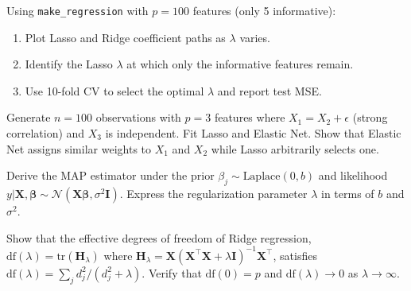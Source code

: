 \begin{exercise}
Using \texttt{make\_regression} with $p=100$ features (only 5 informative):
\begin{enumerate}
    \item Plot Lasso and Ridge coefficient paths as $\lambda$ varies.
    \item Identify the Lasso $\lambda$ at which only the informative features remain.
    \item Use 10-fold CV to select the optimal $\lambda$ and report test MSE.
\end{enumerate}
\end{exercise}

\begin{exercise}
Generate $n=100$ observations with $p=3$ features where $X_1 = X_2 + \epsilon$ (strong correlation) and $X_3$ is independent. Fit Lasso and Elastic Net. Show that Elastic Net assigns similar weights to $X_1$ and $X_2$ while Lasso arbitrarily selects one.
\end{exercise}

\begin{exercise}
Derive the MAP estimator under the prior $\beta_j \sim \text{Laplace}(0, b)$ and likelihood $y|\bm{X},\bm{\beta} \sim \mathcal{N}(\bm{X}\bm{\beta}, \sigma^2\bm{I})$. Express the regularization parameter $\lambda$ in terms of $b$ and $\sigma^2$.
\end{exercise}

\begin{exercise}
Show that the effective degrees of freedom of Ridge regression, $\text{df}(\lambda) = \text{tr}(\bm{H}_\lambda)$ where $\bm{H}_\lambda = \bm{X}(\bm{X}^\top\bm{X}+\lambda\bm{I})^{-1}\bm{X}^\top$, satisfies $\text{df}(\lambda) = \sum_j d_j^2/(d_j^2+\lambda)$. Verify that $\text{df}(0)=p$ and $\text{df}(\lambda) \to 0$ as $\lambda \to \infty$.
\end{exercise}
